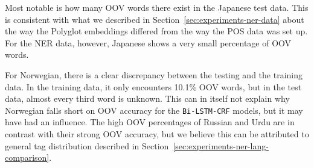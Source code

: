Most notable is how many OOV words there exist in the Japanese test data.
This is consistent with what we described in
Section~\ref{sec:experiments-ner-data} about the way the Polyglot embeddings
differed from the way the POS data was set up. For the NER data, however,
Japanese shows a very small percentage of OOV words.

For Norwegian, there is a clear discrepancy between the testing and the training
data. In the training data, it only encounters 10.1\% OOV words, but in the test
data, almost every third word is unknown. This can in itself not explain why
Norwegian falls short on OOV accuracy for the \texttt{Bi-LSTM-CRF} models, but
it may have had an influence. The high OOV percentages of Russian and Urdu are
in contrast with their strong OOV accuracy, but we believe this can be
attributed to general tag distribution described in
Section~\ref{sec:experiments-ner-lang-comparison}.

